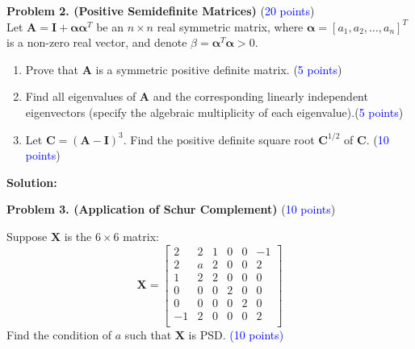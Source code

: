 \documentclass[english,onecolumn]{IEEEtran}
\newcommand{\0}{{\mathbf{0}}} %
\begin{document}
\bigskip







\newpage
\noindent \textbf{Problem 2. (Positive Semidefinite Matrices)} (\textcolor{blue}{20 points}) \\
\noindent Let \( \boldsymbol{A} = \boldsymbol{I} + \boldsymbol{\alpha}\boldsymbol{\alpha}^T \) be an \( n \times n\) real symmetric matrix, where  \( \boldsymbol{\alpha} = [a_1, a_2, \dots, a_n]^T \) is a non-zero real vector, and denote \( \beta = \boldsymbol{\alpha}^T\boldsymbol{\alpha} > 0 \). 

\begin{enumerate}
\item Prove that \( \boldsymbol{A} \) is a symmetric positive definite matrix.
  (\textcolor{blue}{5 points}) 
\item Find all eigenvalues of \( \boldsymbol{A} \) and the corresponding linearly independent eigenvectors (specify the algebraic multiplicity of each eigenvalue).(\textcolor{blue}{5 points}) 
\item Let \( \boldsymbol{C} = (\boldsymbol{A} - \boldsymbol{I})^3\). Find the positive definite square root \( \boldsymbol{C}^{1/2} \) of \( \boldsymbol{C} \).
(\textcolor{blue}{10 points})

\end{enumerate}

\bigskip

\noindent \textbf{Solution:}




\newpage
\noindent \textbf{Problem 3. (Application of Schur Complement)} \hfill (\textcolor{blue}{10 points}) 

\begin{enumerate}
Suppose \(\boldsymbol{X}\) is the \(6 \times 6\) matrix:
\[
\boldsymbol{X} = 
\begin{bmatrix}
2 & 2 & 1 & 0 & 0 & -1  \\
2 & a & 2 & 0 & 0 & 2 \\
1 & 2 & 2 & 0 & 0 & 0  \\
0 & 0 & 0 & 2 & 0 & 0 \\
0 & 0 & 0 & 0 & 2 & 0  \\
-1 & 2 & 0 & 0 & 0 & 2 \\

\end{bmatrix}
\]
Find the condition of \(a\) such that \(\boldsymbol{X}\) is PSD.
\textcolor{blue}{(10 points)}
\end{enumerate}
\end{document}
